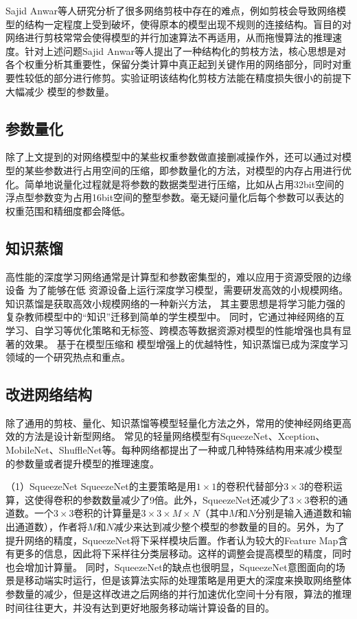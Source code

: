 Sajid Anwar等人\cite{anwar2017structured}研究分析了很多网络剪枝中存在的难点，例如剪枝会导致网络模型的结构一定程度上受到破坏，使得原本的模型出现不规则的连接结构。盲目的对网络进行剪枝常常会使得模型的并行加速算法不再适用，从而拖慢算法的推理速度。针对上述问题Sajid Anwar等人提出了一种结构化的剪枝方法，核心思想是对各个权重分析其重要性，保留分类计算中真正起到关键作用的网络部分，同时对重要性较低的部分进行修剪。实验证明该结构化剪枝方法能在精度损失很小的前提下大幅减少
模型的参数量。

\subsection{参数量化}
除了上文提到的对网络模型中的某些权重参数做直接删减操作外，还可以通过对模型的某些参数进行占用空间的压缩，即参数量化的方法，对模型的内存占用进行优化。简单地说量化过程就是将参数的数据类型进行压缩，比如从占用32bit空间的浮点型参数变为占用16bit空间的整型参数。毫无疑问量化后每个参数可以表达的权重范围和精细度都会降低。

\subsection{知识蒸馏}
高性能的深度学习网络通常是计算型和参数密集型的，难以应用于资源受限的边缘设备  为了能够在低
资源设备上运行深度学习模型，需要研发高效的小规模网络。  知识蒸馏是获取高效小规模网络的一种新兴方法，
其主要思想是将学习能力强的复杂教师模型中的“知识”迁移到简单的学生模型中。  同时，它通过神经网络的互
学习、自学习等优化策略和无标签、跨模态等数据资源对模型的性能增强也具有显著的效果。  基于在模型压缩和
模型增强上的优越特性，知识蒸馏已成为深度学习领域的一个研究热点和重点。 

\subsection{改进网络结构}
除了通用的剪枝、量化、知识蒸馏等模型轻量化方法之外，常用的使神经网络更高效的方法是设计新型网络。
常见的轻量网络模型有SqueezeNet、Xception、MobileNet、ShuffleNet等。每种网络都提出了一种或几种特殊结构用来减少模型的参数量或者提升模型的推理速度。

（1）SqueezeNet
SqueezeNet\cite{iandola2016squeezenet}的主要策略是用$1\times1$的卷积代替部分$3\times3$的卷积运算，这使得卷积的参数数量减少了9倍。此外，SqueezeNet还减少了$3\times3$卷积的通道数。一个$3\times3$卷积的计算量是$3\times3 \times M \times N$（其中$M$和$N$分别是输入通道数和输出通道数），作者将$M$和$N$减少来达到减少整个模型的参数量的目的。另外，为了提升网络的精度，SqueezeNet将下采样模块后置。作者认为较大的Feature Map含有更多的信息，因此将下采样往分类层移动。这样的调整会提高模型的精度，同时也会增加计算量。
同时，SqueezeNet的缺点也很明显，SqueezeNet意图面向的场景是移动端实时运行，但是该算法实际的处理策略是用更大的深度来换取网络整体参数量的减少，但是这样改进之后网络的并行加速优化空间十分有限，算法的推理时间往往更大，并没有达到更好地服务移动端计算设备的目的。

